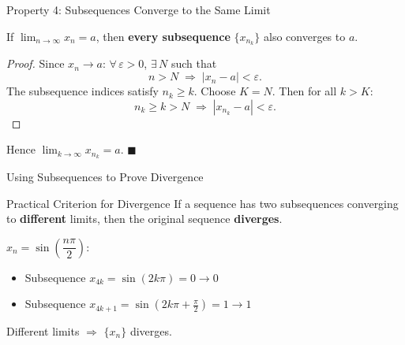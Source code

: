 \documentclass[aspectratio=169,10pt]{beamer}
\begin{document}
\begin{frame}{Property 4: Subsequences Converge to the Same Limit}
  \begin{theorem}
    If $\displaystyle\lim_{n\to\infty}x_n = a$, then \textbf{every subsequence}
    $\{x_{n_k}\}$ also converges to $a$.
  \end{theorem}
  \pause
  \begin{proof}
    Since $x_n \to a$: $\forall\,\varepsilon>0$, $\exists\,N$ such that
    \[
      n > N \;\Longrightarrow\; |x_n - a| < \varepsilon.
    \]
    \pause
    The subsequence indices satisfy $n_k \geq k$.
    Choose $K = N$. Then for all $k > K$:
    \[
      n_k \geq k > N \;\Longrightarrow\; |x_{n_k} - a| < \varepsilon.
    \]
  \end{proof}
  \pause
  \begin{center}
    Hence $\displaystyle\lim_{k\to\infty}x_{n_k} = a$. \hfill$\blacksquare$
  \end{center}
\end{frame}

\begin{frame}{Using Subsequences to Prove Divergence}
  \begin{alertblock}{Practical Criterion for Divergence}
    If a sequence has two subsequences converging to \textbf{different} limits,
    then the original sequence \textbf{diverges}.
  \end{alertblock}
  \pause
  \begin{example}
    $x_n = \sin\!\left(\dfrac{n\pi}{2}\right)$:
    \begin{itemize}
      \item Subsequence $x_{4k} = \sin(2k\pi) = 0 \to 0$
      \item Subsequence $x_{4k+1} = \sin(2k\pi+\frac{\pi}{2}) = 1 \to 1$
    \end{itemize}
    Different limits $\Rightarrow$ $\{x_n\}$ diverges.
  \end{example}
\end{frame}
\end{document}
